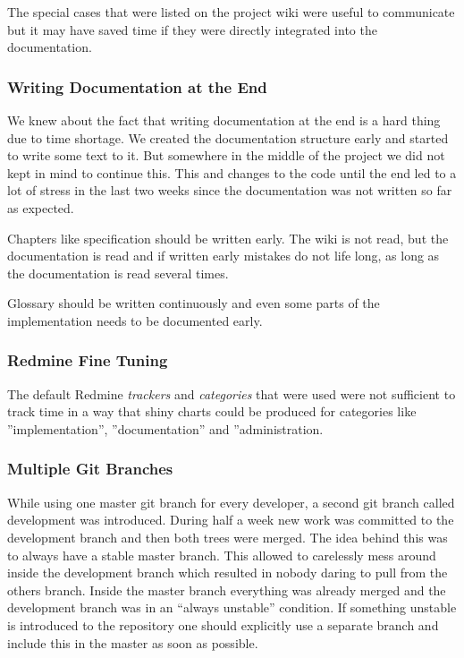 The special cases that were listed on the project wiki were useful to 
communicate but it may have saved time if they were directly integrated into 
the documentation.

\subsubsection*{Writing Documentation at the End}

We knew about the fact that writing documentation at the end is a hard thing
due to time shortage. We created the documentation structure early and started
to write some text to it. But somewhere in the middle of the project we did not
kept in mind to continue this. This and changes to the code until the end led
to a lot of stress in the last two weeks since the documentation was not
written so far as expected.

Chapters like specification should be written early. The wiki is not read, but
the documentation is read and if written early mistakes do not life long, as
long as the documentation is read several times.

Glossary should be written continuously and even some parts of the
implementation needs to be documented early.

\subsubsection*{Redmine Fine Tuning}

The default Redmine \textit{trackers} and \textit{categories} that were used 
were not sufficient to track time in a way that shiny charts could be produced 
for categories like ''implementation'', ''documentation'' and ''administration. 

\subsubsection*{Multiple Git Branches}

While using one master git branch for every developer, a second git branch 
called development was introduced. During half a week new work was committed to
the
development branch and then both trees were merged. The idea behind this was to
always have a stable master branch. This allowed to carelessly mess around
inside the development branch which resulted in nobody daring
to pull from the others branch. Inside the master branch everything was already
merged and
the development branch was in an ``always unstable'' condition.
If something unstable is introduced to the repository one should explicitly use
a separate branch and include this in the master as soon as possible.

